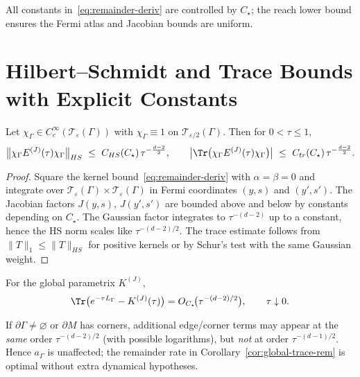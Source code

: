 \begin{remark}[Uniformity]
All constants in~\eqref{eq:remainder-deriv} are controlled by $C_\star$; the reach lower bound ensures the Fermi atlas and Jacobian bounds are uniform.
\end{remark}

\section{Hilbert--Schmidt and Trace Bounds with Explicit Constants}
\label{sec:hs-bounds}

\begin{lemma}\label{lem:HS-collar}
Let $\chi_\Gamma\in C_c^\infty(\mathcal T_{\varepsilon}(\Gamma))$ with $\chi_\Gamma\equiv 1$ on $\mathcal T_{\varepsilon/2}(\Gamma)$.
Then for $0<\tau\le 1$,
\[
\big\|\chi_\Gamma E^{(J)}(\tau)\chi_\Gamma\big\|_{HS}
\ \le\ C_{HS}(C_\star)\,\tau^{-\frac{d-2}{2}},\qquad
\big|\Tr\big(\chi_\Gamma E^{(J)}(\tau)\chi_\Gamma\big)\big|
\ \le\ C_{tr}(C_\star)\,\tau^{-\frac{d-2}{2}}.
\]
\end{lemma}

\begin{proof}
Square the kernel bound~\eqref{eq:remainder-deriv} with $\alpha=\beta=0$ and integrate over $\mathcal T_{\varepsilon}(\Gamma)\times \mathcal T_{\varepsilon}(\Gamma)$ in Fermi coordinates $(y,s)$ and $(y',s')$. The Jacobian factors $J(y,s)$, $J(y',s')$ are bounded above and below by constants depending on $C_\star$. The Gaussian factor integrates to $\tau^{-(d-2)}$ up to a constant, hence the HS norm scales like $\tau^{-(d-2)/2}$. The trace estimate follows from $\|T\|_1\le \|T\|_{HS}$ for positive kernels or by Schur’s test with the same Gaussian weight.
\end{proof}

\begin{corollary}\label{cor:global-trace-rem}
For the global parametrix $K^{(J)}$,
\[
\Tr\big(e^{-\tau L_\Gamma}-K^{(J)}(\tau)\big)=O_{C_\star}\!\big(\tau^{-(d-2)/2}\big),\qquad \tau\downarrow 0.
\]
\end{corollary}

\begin{remark}
If $\partial\Gamma\neq\varnothing$ or $\partial M$ has corners, additional edge/corner terms may appear at the \emph{same} order $\tau^{-(d-2)/2}$ (with possible logarithms), but \emph{not} at order $\tau^{-(d-1)/2}$. Hence $a_\Gamma$ is unaffected; the remainder rate in Corollary~\ref{cor:global-trace-rem} is optimal without extra dynamical hypotheses.
\end{remark}

